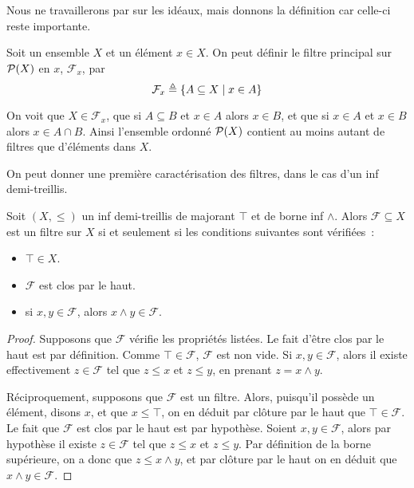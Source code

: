 Nous ne travaillerons par sur les idéaux, mais donnons la définition car
celle-ci reste importante.

\begin{example}
  Soit un ensemble $X$ et un élément $x\in X$. On peut définir le filtre
  principal sur $\mathcal{P}(X)$ en $x$, $\mathcal F_x$, par
  \[\mathcal F_x \triangleq \{A\subseteq X\mid x \in A\}\]

  On voit que $X\in \mathcal F_x$, que si $A\subseteq B$ et $x\in A$ alors
  $x\in B$, et que si $x\in A$ et $x\in B$ alors $x\in A\cap B$. Ainsi
  l'ensemble ordonné $\mathcal{P}(X)$ contient au moins autant de filtres que
  d'éléments dans $X$.
\end{example}

On peut donner une première caractérisation des filtres, dans le cas d'un
inf demi-treillis.

\begin{property}
  Soit $(X,\leq)$ un inf demi-treillis de majorant $\top$ et de borne inf
  $\land$. Alors $\mathcal F\subseteq X$ est un filtre sur $X$ si et seulement
  si les conditions suivantes sont vérifiées~:
  \begin{itemize}
  \item $\top \in X$.
  \item $\mathcal F$ est clos par le haut.
  \item si $x,y\in \mathcal F$, alors $x\land y\in \mathcal F$.
  \end{itemize}
\end{property}

\begin{proof}
  Supposons que $\mathcal F$ vérifie les propriétés listées. Le fait d'être
  clos par le haut est par définition. Comme $\top\in\mathcal F$,
  $\mathcal F$ est non vide. Si $x,y\in\mathcal F$, alors il existe
  effectivement $z\in \mathcal F$ tel que $z\leq x$ et $z\leq y$, en prenant
  $z = x\land y$.

  Réciproquement, supposons que $\mathcal F$ est un filtre. Alors, puisqu'il
  possède un élément, disons $x$, et que $x\leq \top$, on en déduit par clôture
  par le haut que $\top\in\mathcal F$. Le fait que $\mathcal F$ est clos par le
  haut est par hypothèse. Soient $x,y\in \mathcal F$, alors par hypothèse il
  existe $z\in \mathcal F$ tel que $z\leq x$ et $z\leq y$. Par définition de la
  borne supérieure, on a donc que $z\leq x\land y$, et par clôture par le haut
  on en déduit que $x\land y \in \mathcal F$.
\end{proof}

